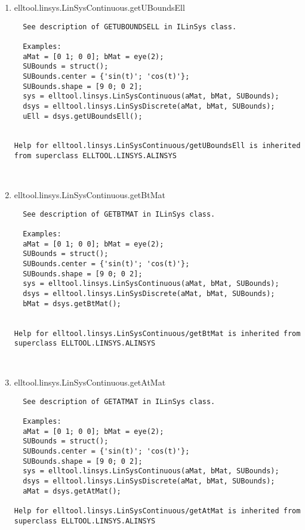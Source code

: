 \begin{enumerate}
\begin{lstlisting}
\end{lstlisting}
\fontfamily{\familydefault}
\selectfont
\item {elltool.linsys.LinSysContinuous.getUBoundsEll}
\selectfont
\begin{lstlisting}
  See description of GETUBOUNDSELL in ILinSys class.

  Examples:
  aMat = [0 1; 0 0]; bMat = eye(2);
  SUBounds = struct();
  SUBounds.center = {'sin(t)'; 'cos(t)'};
  SUBounds.shape = [9 0; 0 2];
  sys = elltool.linsys.LinSysContinuous(aMat, bMat, SUBounds);
  dsys = elltool.linsys.LinSysDiscrete(aMat, bMat, SUBounds);
  uEll = dsys.getUBoundsEll();


Help for elltool.linsys.LinSysContinuous/getUBoundsEll is inherited from superclass ELLTOOL.LINSYS.ALINSYS



\end{lstlisting}
\fontfamily{\familydefault}
\selectfont
\item {elltool.linsys.LinSysContinuous.getBtMat}
\selectfont
\begin{lstlisting}
  See description of GETBTMAT in ILinSys class.

  Examples:
  aMat = [0 1; 0 0]; bMat = eye(2);
  SUBounds = struct();
  SUBounds.center = {'sin(t)'; 'cos(t)'};
  SUBounds.shape = [9 0; 0 2];
  sys = elltool.linsys.LinSysContinuous(aMat, bMat, SUBounds);
  dsys = elltool.linsys.LinSysDiscrete(aMat, bMat, SUBounds);
  bMat = dsys.getBtMat();


Help for elltool.linsys.LinSysContinuous/getBtMat is inherited from superclass ELLTOOL.LINSYS.ALINSYS



\end{lstlisting}
\fontfamily{\familydefault}
\selectfont
\item {elltool.linsys.LinSysContinuous.getAtMat}
\selectfont
\begin{lstlisting}
  See description of GETATMAT in ILinSys class.

  Examples:
  aMat = [0 1; 0 0]; bMat = eye(2);
  SUBounds = struct();
  SUBounds.center = {'sin(t)'; 'cos(t)'};
  SUBounds.shape = [9 0; 0 2];
  sys = elltool.linsys.LinSysContinuous(aMat, bMat, SUBounds);
  dsys = elltool.linsys.LinSysDiscrete(aMat, bMat, SUBounds);
  aMat = dsys.getAtMat();

Help for elltool.linsys.LinSysContinuous/getAtMat is inherited from superclass ELLTOOL.LINSYS.ALINSYS




\end{lstlisting}
\end{enumerate}

